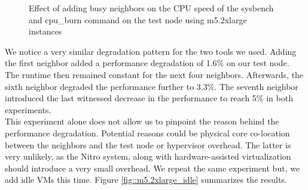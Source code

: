 \begin{figure}[H]
\centering
{}
\caption{Effect of adding busy neighbors on the CPU speed of the sysbench and cpu\_burn command on the 
test node using m5.2xlarge instances}
\label{fig::m5.2xlarge_busy}
\end{figure}
\noindent
We notice a very similar degradation pattern for the two tools we used.
Adding the first neighbor added a performance degradation of  1.6\% on our test node. The runtime then 
remained constant for the next four neighbors. Afterwards, the sixth neighbor degraded the performance
further to 3.3\%. The seventh neighbor introduced the last witnessed decrease in the performance to 
reach 5\% in both experiments. \\ 
This experiment alone does not allow us to pinpoint the reason behind the performance degradation.
Potential reasons could be physical core co-location between the neighbors and the test node or 
hypervisor overhead. The latter is very unlikely, as the Nitro system, along with hardware-assisted 
virtualization should introduce a very small overhead. 
We repeat the same experiment but, we add idle VMs this time. 
Figure \ref{fig::m5.2xlarge_idle} summarizes the results. 

